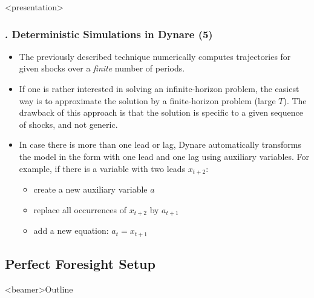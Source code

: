 \documentclass[11pt,aspectratio=169]{beamer}
\begin{document}
\begin{frame}<presentation>
	\frametitle{{\thesection.\thesubsection} Deterministic Simulations in Dynare (5)}
	\begin{itemize}
		\justifying
		\item The previously described technique numerically computes trajectories for given shocks over a \textit{finite} number of periods. 
		\item If one is rather interested in solving an infinite-horizon problem, the easiest way is to approximate the solution by a finite-horizon problem (large $T$). The drawback of this approach is that the solution is specific to a given sequence of shocks, and not generic.  
		\item In case there is more than one lead or lag, Dynare automatically transforms the model in the form with one lead and one lag using auxiliary variables. For example, if there is a variable with two leads $x_{t+2}$:
		\begin{itemize}
			\item create a new auxiliary variable $a$
			\item replace all occurrences of $x_{t+2}$ by $a_{t+1}$
			\item add a new equation: $a_t = x_{t+1}$		
		\end{itemize}
	\end{itemize}
\end{frame}

\subsection{Perfect Foresight Setup}
\begin{frame}<beamer>{Outline}
	\tableofcontents[sectionstyle=hide/hide, subsectionstyle=show/shaded/hide, subsubsectionstyle=show/show/hide]
\end{frame}
\end{document}
